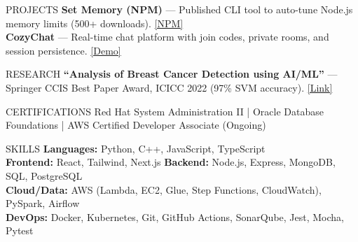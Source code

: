 \documentclass[10pt]{resume}
\begin{document}
\begin{rSection}{PROJECTS}
\textbf{Set Memory (NPM)} — Published CLI tool to auto-tune Node.js memory limits (500+ downloads). \href{https://www.npmjs.com/package/set-memory}{[NPM]} \\
\textbf{CozyChat} — Real-time chat platform with join codes, private rooms, and session persistence. \href{https://cozy-chat-frontend-30.vercel.app/}{[Demo]}
\end{rSection}

\begin{rSection}{RESEARCH}
\textbf{“Analysis of Breast Cancer Detection using AI/ML”} — Springer CCIS Best Paper Award, ICICC 2022 (97\% SVM accuracy). \href{https://link.springer.com/chapter/10.1007/978-981-19-4990-6_57}{[Link]}
\end{rSection}

\begin{rSection}{CERTIFICATIONS}
Red Hat System Administration II \quad | \quad Oracle Database Foundations \quad | \quad AWS Certified Developer Associate (Ongoing)
\end{rSection}

\begin{rSection}{SKILLS}
\textbf{Languages:} Python, C++, JavaScript, TypeScript \\
\textbf{Frontend:} React, Tailwind, Next.js \quad
\textbf{Backend:} Node.js, Express, MongoDB, SQL, PostgreSQL \\
\textbf{Cloud/Data:} AWS (Lambda, EC2, Glue, Step Functions, CloudWatch), PySpark, Airflow \\
\textbf{DevOps:} Docker, Kubernetes, Git, GitHub Actions, SonarQube, Jest, Mocha, Pytest
\end{rSection}
\end{document}

